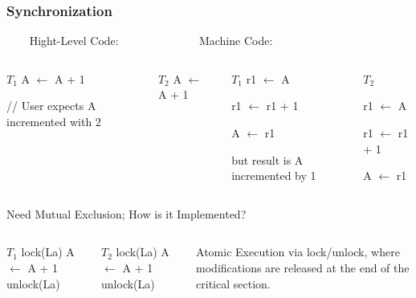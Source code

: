 \documentclass{beamer}
\renewcommand{\emph}[1]{\textcolor{structure}{#1}}
\newcommand{\emp}[1]{\textcolor{DikuRed}{ #1}}
\newcommand{\mymath}[1]{$ #1 $}
\newcommand{\myindx}[1]{_{#1}}
\begin{document}
\begin{frame}[fragile,t]
\frametitle{Synchronization}

\begin{block}{{\tt~~~~}Hight-Level Code:{\tt~~~~~~~~~~~~~~}Machine Code:{\tt~~~~~~~~~}}
\begin{columns}
\begin{colorcode}[fontsize=\scriptsize]
\mymath{T\myindx{1}}
A \mymath{\leftarrow} A + 1





// \emph{User expects A incremented with 2}
\end{colorcode} 
\begin{colorcode}[fontsize=\scriptsize]
\mymath{T\myindx{2}}
A \mymath{\leftarrow} A + 1






\end{colorcode}
\pause
\begin{colorcode}[fontsize=\scriptsize]
\mymath{T\myindx{1}}
r1 \mymath{\leftarrow} A

r1 \mymath{\leftarrow} r1 + 1

A \mymath{\leftarrow} r1

\alert{but result is A incremented by 1}
\end{colorcode} 
\begin{colorcode}[fontsize=\scriptsize]
\mymath{T\myindx{2}}

r1 \mymath{\leftarrow} A

r1 \mymath{\leftarrow} r1 + 1

A \mymath{\leftarrow} r1

\end{colorcode} 
\end{columns}
\end{block}
\bigskip


\begin{block}{Need Mutual Exclusion; \alert{How is it Implemented?}}
\begin{columns}
\begin{colorcode}[fontsize=\scriptsize]
\mymath{T\myindx{1}}
lock(La)
A \mymath{\leftarrow} A + 1
unlock(La)
\end{colorcode} 
\begin{colorcode}[fontsize=\scriptsize]
\mymath{T\myindx{2}}
lock(La)
A \mymath{\leftarrow} A + 1
unlock(La)
\end{colorcode} 
Atomic Execution via lock/unlock,
where modifications are released
at the end of the critical section.
\end{columns}
\end{block}
 
\end{frame}
\end{document}
